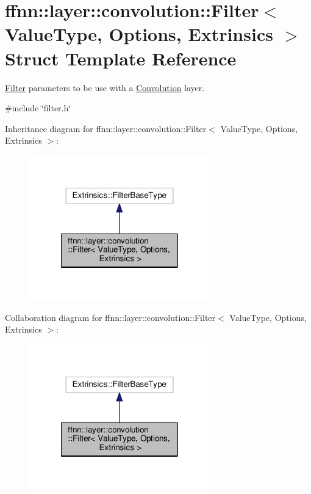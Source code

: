 \hypertarget{structffnn_1_1layer_1_1convolution_1_1_filter}{\section{ffnn\-:\-:layer\-:\-:convolution\-:\-:Filter$<$ Value\-Type, Options, Extrinsics $>$ Struct Template Reference}
\label{structffnn_1_1layer_1_1convolution_1_1_filter}
}


\hyperlink{structffnn_1_1layer_1_1convolution_1_1_filter}{Filter} parameters to be use with a \hyperlink{classffnn_1_1layer_1_1_convolution}{Convolution} layer.  




{\ttfamily \#include \char`\"{}filter.\-h\char`\"{}}



Inheritance diagram for ffnn\-:\-:layer\-:\-:convolution\-:\-:Filter$<$ Value\-Type, Options, Extrinsics $>$\-:\nopagebreak
\begin{figure}[H]
\begin{center}
\leavevmode
\includegraphics[width=222pt]{structffnn_1_1layer_1_1convolution_1_1_filter__inherit__graph}
\end{center}
\end{figure}


Collaboration diagram for ffnn\-:\-:layer\-:\-:convolution\-:\-:Filter$<$ Value\-Type, Options, Extrinsics $>$\-:
\nopagebreak
\begin{figure}[H]
\begin{center}
\leavevmode
\includegraphics[width=222pt]{structffnn_1_1layer_1_1convolution_1_1_filter__coll__graph}
\end{center}
\end{figure}
